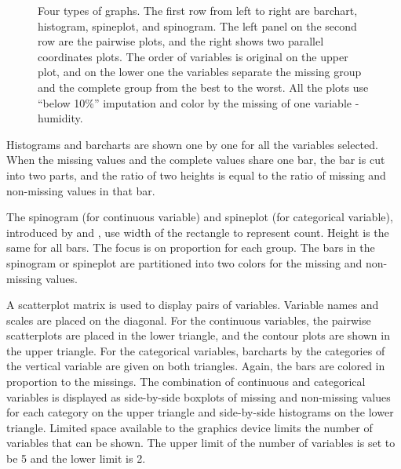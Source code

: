 \documentclass[article]{jss}
\begin{document}
\begin{center}
\begin{figure}[h]
\begin{centering}
\par\end{centering}
\caption{Four types of graphs.
The first row from left to right are barchart, histogram, spineplot, and spinogram. The left panel on the second row are the pairwise plots, and the right shows two parallel coordinates plots. The order of variables is original on the upper plot, and on the lower one the variables separate the missing group and the complete group from the best to the worst. All the plots use ``below 10\%'' imputation and color by the missing of one variable - humidity.}
\label{fig:graphtypes}
\end{figure}
\par\end{center}


Histograms and barcharts are shown one by one for all the variables selected. When the missing values and the complete values share one bar, the bar is cut into two parts, and the ratio of two heights is equal to the ratio of missing and non-missing values in that bar.

The spinogram (for continuous variable) and spineplot (for categorical variable), introduced by \citet{hummel1996linked} and \citet{theus1999visualizing}, use width of the rectangle to represent count. Height is the same for all bars. The focus is on proportion for each group. The bars in the spinogram or spineplot are partitioned into two colors for the missing and non-missing values.

A scatterplot matrix is used to display pairs of variables. Variable names and scales are placed on the diagonal. For the continuous variables, the pairwise scatterplots are placed in the lower triangle, and the contour plots are shown in the upper triangle. For the categorical variables, barcharts by the categories of the vertical variable are given on both triangles. Again, the bars are colored in proportion to the missings. The combination of continuous and categorical variables is displayed as side-by-side boxplots of missing and non-missing values for each category on the upper triangle and side-by-side histograms on the lower triangle. Limited space available to the graphics device limits the number of variables that can be shown. The upper limit of the number of variables is set to be 5 and the lower limit is 2.
\end{document}
